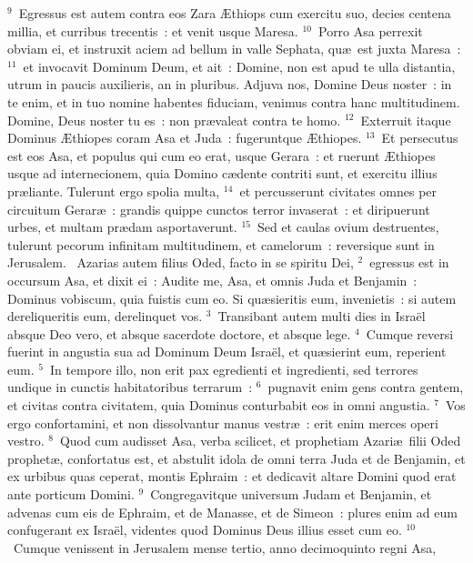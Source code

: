 ${}^{9}$~Egressus est autem contra eos Zara \AE thiops cum exercitu suo, decies centena millia, et curribus trecentis~: et venit usque Maresa.
${}^{10}$~Porro Asa perrexit obviam ei, et instruxit aciem ad bellum in valle Sephata, qu\ae\ est juxta Maresa~:
${}^{11}$~et invocavit Dominum Deum, et ait~: Domine, non est apud te ulla distantia, utrum in paucis auxilieris, an in pluribus. Adjuva nos, Domine Deus noster~: in te enim, et in tuo nomine habentes fiduciam, venimus contra hanc multitudinem. Domine, Deus noster tu es~: non pr\ae valeat contra te homo.
${}^{12}$~Exterruit itaque Dominus \AE thiopes coram Asa et Juda~: fugeruntque \AE thiopes.
${}^{13}$~Et persecutus est eos Asa, et populus qui cum eo erat, usque Gerara~: et ruerunt \AE thiopes usque ad internecionem, quia Domino c\ae dente contriti sunt, et exercitu illius pr\ae liante. Tulerunt ergo spolia multa,
${}^{14}$~et percusserunt civitates omnes per circuitum Gerar\ae~: grandis quippe cunctos terror invaserat~: et diripuerunt urbes, et multam pr\ae dam asportaverunt.
${}^{15}$~Sed et caulas ovium destruentes, tulerunt pecorum infinitam multitudinem, et camelorum~: reversique sunt in Jerusalem.
~\lettrine[lines=10,image=true,loversize=0.05,lraise=-0.03]{A}{}zarias autem filius Oded, facto in se spiritu Dei,
${}^{2}$~egressus est in occursum Asa, et dixit ei~: Audite me, Asa, et omnis Juda et Benjamin~: Dominus vobiscum, quia fuistis cum eo. Si qu\ae sieritis eum, invenietis~: si autem dereliqueritis eum, derelinquet vos.
${}^{3}$~Transibant autem multi dies in Isra\"el absque Deo vero, et absque sacerdote doctore, et absque lege.
${}^{4}$~Cumque reversi fuerint in angustia sua ad Dominum Deum Isra\"el, et qu\ae sierint eum, reperient eum.
${}^{5}$~In tempore illo, non erit pax egredienti et ingredienti, sed terrores undique in cunctis habitatoribus terrarum~:
${}^{6}$~pugnavit enim gens contra gentem, et civitas contra civitatem, quia Dominus conturbabit eos in omni angustia.
${}^{7}$~Vos ergo confortamini, et non dissolvantur manus vestr\ae~: erit enim merces operi vestro.
${}^{8}$~Quod cum audisset Asa, verba scilicet, et prophetiam Azari\ae\ filii Oded prophet\ae , confortatus est, et abstulit idola de omni terra Juda et de Benjamin, et ex urbibus quas ceperat, montis Ephraim~: et dedicavit altare Domini quod erat ante porticum Domini.
${}^{9}$~Congregavitque universum Judam et Benjamin, et advenas cum eis de Ephraim, et de Manasse, et de Simeon~: plures enim ad eum confugerant ex Isra\"el, videntes quod Dominus Deus illius esset cum eo.
${}^{10}$~Cumque venissent in Jerusalem mense tertio, anno decimoquinto regni Asa,
